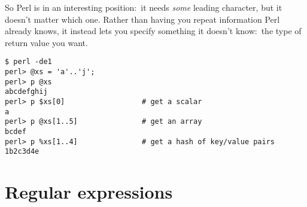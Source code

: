 \documentclass{article}
\begin{document}
So Perl is in an interesting position:~it needs {\em some} leading character,
but it doesn't matter which one. Rather than having you repeat information Perl
already knows, it instead lets you specify something it doesn't know:~the type
of return value you want.

\begin{verbatim}
$ perl -de1
perl> @xs = 'a'..'j';
perl> p @xs
abcdefghij
perl> p $xs[0]                  # get a scalar
a
perl> p @xs[1..5]               # get an array
bcdef
perl> p %xs[1..4]               # get a hash of key/value pairs
1b2c3d4e
\end{verbatim}

\section{Regular expressions}
\end{document}

